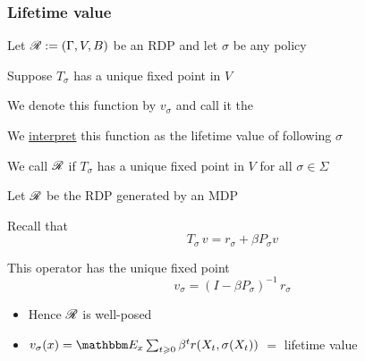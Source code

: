 \documentclass[dvipsnames]{beamer}
\begin{document}
\begin{frame}
    \frametitle{Lifetime value}


    Let $\mathscr R := (\Gamma, V, B)$ be an RDP and let $\sigma$ be any policy
    
    \vspace{0.5em}
    \vspace{0.5em}
    Suppose $T_\sigma$ has a unique fixed point in $V$

    \vspace{0.5em}
    \vspace{0.5em}
    We denote this function by $v_\sigma$ and call it the 

    \vspace{0.5em}
    \vspace{0.5em}
    We \underline{interpret} this function as the lifetime value of following
    $\sigma$

    \vspace{0.5em}
    \vspace{0.5em}
    \vspace{0.5em}

    We call $\mathscr R$  if $T_\sigma$ has a unique
    fixed point in $V$ for all $\sigma \in \Sigma$

\end{frame}


\begin{frame}

    \Eg Let $\mathscr R$ be the RDP generated by an MDP

    \vspace{0.5em}
    \vspace{0.5em}
    Recall that 
    \begin{equation*}
        T_\sigma \, v 
        = r_\sigma + \beta P_\sigma v
    \end{equation*}


    \vspace{0.5em}
    This operator has the unique fixed point 
    \begin{equation*}
        v_\sigma 
        = (I - \beta P_\sigma)^{-1} \, r_\sigma 
    \end{equation*}

    \vspace{0.5em}
    \vspace{0.5em}
    \vspace{0.5em}
    \begin{itemize}
        \item Hence $\mathscr R$ is well-posed
        \vspace{0.5em}
        \item $v_\sigma(x) = \EE_x \sum_{t \geq 0} \beta^t r(X_t, \sigma(X_t))$
            $=$ lifetime value
    \end{itemize}

\end{frame}
\end{document}
